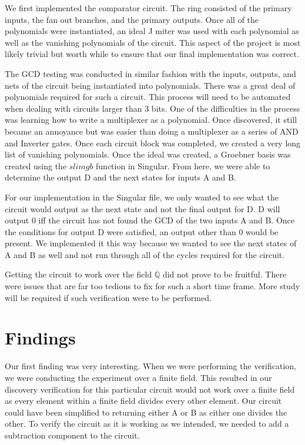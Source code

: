 \documentclass[12pt]{report}
\begin{document}
We first implemented the comparator circuit. The ring consisted of the primary inputs, the fan out branches, and the primary outputs. Once all of the polynomials were instantiated, an ideal J miter was used with each polynomial as well as the vanishing polynomials of the circuit. This aspect of the project is most likely trivial but worth while to ensure that our final implementation was correct. 

The GCD testing was conducted in similar fashion with the inputs, outputs, and nets of the circuit being instantiated into polynomials. There was a great deal of polynomials required for such a circuit. This process will need to be automated when dealing with circuits larger than 3 bits. One of the difficulties in the process was learning how to write a multiplexer as a polynomial. Once discovered, it still became an annoyance but was easier than doing a multiplexer as a series of AND and Inverter gates. Once each circuit block was completed, we created a very long list of vanishing polynomials. Once the ideal was created, a Groebner basis was created using the $slimgb$ function in Singular. From here, we were able to determine the output D and the next states for inputs A and B. 

For our implementation in the Singular file, we only wanted to see what the circuit would output as the next state and not the final output for D. D will output 0 iff the circuit has not found the GCD of the two inputs A and B. Once the conditions for output D were satisfied, an output other than 0 would be present. We implemented it this way because we wanted to see the next states of A and B as well and not run through all of the cycles required for the circuit. 

Getting the circuit to work over the field $\mathbb{Q}$ did not prove to be fruitful. There were issues that are far too tedious to fix for such a short time frame. More study will be required if such verification were to be performed. 

\section{Findings}

Our first finding was very interesting. When we were performing the verification, we were conducting the experiment over a finite field. This resulted in our discovery verification for this particular circuit would not work over a finite field as every element within a finite field divides every other element. Our circuit could have been simplified to returning either A or B as either one divides the other. To verify the circuit as it is working as we intended, we needed to add a subtraction component to the circuit.
\end{document}
